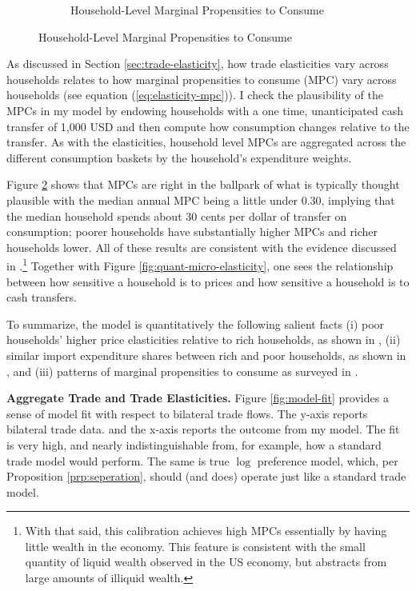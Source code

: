 \documentclass[12pt,pdftex]{article}
\begin{document}
\begin{onehalfspacing}
\begin{figure}[t!]
\begin{subfigure}{.758\textwidth}
\caption{Household-Level Marginal Propensities to Consume}\label{fig:quant-mpcs}
\end{subfigure}
\end{figure}


As discussed in Section \ref{sec:trade-elasticity}, how trade elasticities vary across households relates to how marginal propensities to consume (MPC) vary across households (see equation (\ref{eq:elasticity-mpc})). I check the plausibility of the MPCs in my model by endowing households with a one time, unanticipated cash transfer of 1,000 USD and then compute how consumption changes relative to the transfer. As with the elasticities, household level MPCs are aggregated across the different consumption baskets by the household's expenditure weights.

Figure \ref{fig:quant-mpcs} shows that MPCs are right in the ballpark of what is typically thought plausible with the median annual MPC being a little under 0.30, implying that the median household spends about 30 cents per dollar of transfer on consumption; poorer households have substantially higher MPCs and richer households lower. All of these results are consistent with the evidence discussed in \citet{kaplan2022marginal}.\footnote{With that said, this calibration achieves high MPCs essentially by having little wealth in the economy. This feature is consistent with the small quantity of liquid wealth observed in the US economy, but abstracts from large amounts of illiquid wealth.} Together with Figure \ref{fig:quant-micro-elasticity}, one sees the relationship between how sensitive a household is to prices and how sensitive a household is to cash transfers.

To summarize, the model is quantitatively the following salient facts (i) poor households' higher price elasticities relative to rich households, as shown in \citet{auer2022unequal}, (ii) similar import expenditure shares between rich and poor households, as shown in \citet{borusyak2021distributional}, and (iii) patterns of marginal propensities to consume as surveyed in \citet{kaplan2022marginal}.


\textbf{Aggregate Trade and Trade Elasticities.} Figure \ref{fig:model-fit} provides a sense of model fit with respect to bilateral trade flows. The y-axis reports bilateral trade data. and the x-axis reports the outcome from my model. The fit is very high, and nearly indistinguishable from, for example, how a standard trade model would perform. The same is true $\log$ preference model, which, per Proposition \ref{prp:seperation}, should (and does) operate just like a standard trade model.


\end{onehalfspacing}
\end{document}
